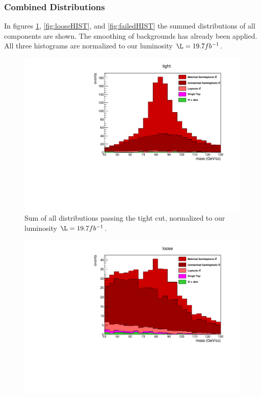 \begin{}[h!]
\subsubsection{Combined Distributions}
In figures \ref{fig:tightHIST}, \ref{fig:looseHIST}, and \ref{fig:failedHIST} the summed distributions of all components are shown. The smoothing of backgrounds has already been applied. All three histograms are normalized to our luminosity $\L = 19.7 fb^{-1}$.
\begin{figure}[h!]
\centering
\includegraphics[scale=0.66]{figs/WtagSF/TOTAL_TIGHT.pdf}
\caption{Sum of all distributions passing the tight cut, normalized to our luminosity $\L = 19.7 fb^{-1}$.}\label{fig:tightHIST}
\end{figure}
\begin{figure}[h!]
\centering
\includegraphics[scale=0.66]{figs/WtagSF/TOTAL_LOOSE.pdf}

\end{figure}
\end{}
